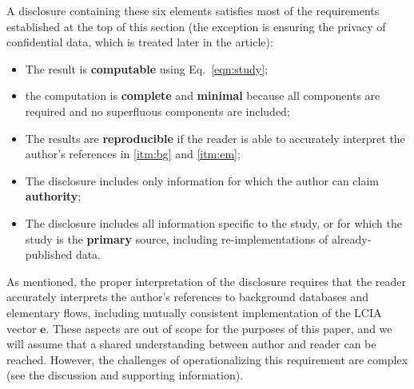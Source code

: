 A disclosure containing these six elements satisfies most of the requirements established at the top of this section (the exception is ensuring the privacy of confidential data, which is treated later in the article):
\begin{itemize}
  \item The result is \textbf{computable} using Eq.~\ref{eqn:study};
  \item the computation is \textbf{complete} and \textbf{minimal} because all components are required and no superfluous components are included;
  \item The results are \textbf{reproducible} if the reader is able to accurately interpret the author's references in \ref{itm:bg} and \ref{itm:em};
  \item The disclosure includes only information for which the author can claim \textbf{authority};
  \item The disclosure includes all information specific to the study, or for which the study is the \textbf{primary} source, including re-implementations of already-published data. 
\end{itemize}
As mentioned, the proper interpretation of the disclosure requires that the reader accurately interprets the author's references to background databases and elementary flows, including mutually consistent implementation of the LCIA vector $\mathbf{e}$.  These aspects are out of scope for the purposes of this paper, and we will assume that a shared understanding between author and reader can be reached.  However, the challenges of operationalizing this requirement are complex (see the discussion and supporting information).  %

